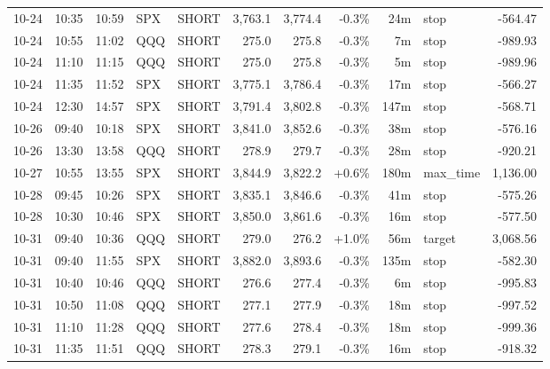 \documentclass[11pt,a4paper,twoside]{article}
\begin{document}
\begin{center}
\begin{longtable}{>{\color{txtmain}}l l l l l r r r r >{\color{txtmain}}l r}
10-24 & 10:35 & 10:59 & SPX & SHORT & 3,763.1 & 3,774.4 & \textcolor{lossred}{-0.3\%} & 24m & stop & \textcolor{lossred}{-564.47} \\
10-24 & 10:55 & 11:02 & QQQ & SHORT & 275.0 & 275.8 & \textcolor{lossred}{-0.3\%} & 7m & stop & \textcolor{lossred}{-989.93} \\
10-24 & 11:10 & 11:15 & QQQ & SHORT & 275.0 & 275.8 & \textcolor{lossred}{-0.3\%} & 5m & stop & \textcolor{lossred}{-989.96} \\
10-24 & 11:35 & 11:52 & SPX & SHORT & 3,775.1 & 3,786.4 & \textcolor{lossred}{-0.3\%} & 17m & stop & \textcolor{lossred}{-566.27} \\
10-24 & 12:30 & 14:57 & SPX & SHORT & 3,791.4 & 3,802.8 & \textcolor{lossred}{-0.3\%} & 147m & stop & \textcolor{lossred}{-568.71} \\
10-26 & 09:40 & 10:18 & SPX & SHORT & 3,841.0 & 3,852.6 & \textcolor{lossred}{-0.3\%} & 38m & stop & \textcolor{lossred}{-576.16} \\
10-26 & 13:30 & 13:58 & QQQ & SHORT & 278.9 & 279.7 & \textcolor{lossred}{-0.3\%} & 28m & stop & \textcolor{lossred}{-920.21} \\
10-27 & 10:55 & 13:55 & SPX & SHORT & 3,844.9 & 3,822.2 & \textcolor{wingreen}{+0.6\%} & 180m & max\_time & \textcolor{wingreen}{1,136.00} \\
10-28 & 09:45 & 10:26 & SPX & SHORT & 3,835.1 & 3,846.6 & \textcolor{lossred}{-0.3\%} & 41m & stop & \textcolor{lossred}{-575.26} \\
10-28 & 10:30 & 10:46 & SPX & SHORT & 3,850.0 & 3,861.6 & \textcolor{lossred}{-0.3\%} & 16m & stop & \textcolor{lossred}{-577.50} \\
10-31 & 09:40 & 10:36 & QQQ & SHORT & 279.0 & 276.2 & \textcolor{wingreen}{+1.0\%} & 56m & target & \textcolor{wingreen}{3,068.56} \\
10-31 & 09:40 & 11:55 & SPX & SHORT & 3,882.0 & 3,893.6 & \textcolor{lossred}{-0.3\%} & 135m & stop & \textcolor{lossred}{-582.30} \\
10-31 & 10:40 & 10:46 & QQQ & SHORT & 276.6 & 277.4 & \textcolor{lossred}{-0.3\%} & 6m & stop & \textcolor{lossred}{-995.83} \\
10-31 & 10:50 & 11:08 & QQQ & SHORT & 277.1 & 277.9 & \textcolor{lossred}{-0.3\%} & 18m & stop & \textcolor{lossred}{-997.52} \\
10-31 & 11:10 & 11:28 & QQQ & SHORT & 277.6 & 278.4 & \textcolor{lossred}{-0.3\%} & 18m & stop & \textcolor{lossred}{-999.36} \\
10-31 & 11:35 & 11:51 & QQQ & SHORT & 278.3 & 279.1 & \textcolor{lossred}{-0.3\%} & 16m & stop & \textcolor{lossred}{-918.32} \\

\end{longtable}
\end{center}
\end{document}
